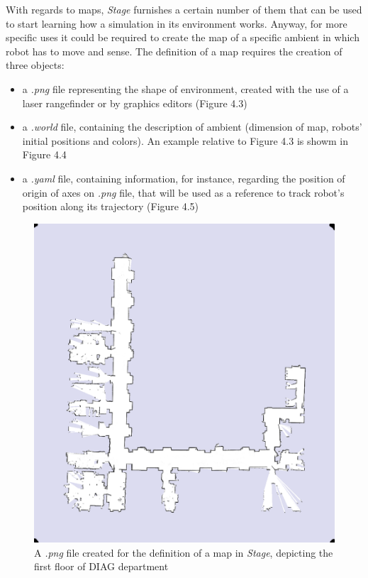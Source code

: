 \documentclass[a4paper, onecolumn]{report}
\begin{document}
With regards to maps, \emph{Stage} furnishes a certain number of them that can be used to start learning how a simulation in its environment works. Anyway, for more specific uses it could be required to create the map of a specific ambient in which robot has to move and sense. The definition of a map requires the creation of three objects:
\begin{itemize}
	\item{a \emph{.png} file representing the shape of environment, created with the use of a laser rangefinder or by graphics editors (Figure 4.3)}
	\item{a \emph{.world} file, containing the description of ambient (dimension of map, robots' initial positions and colors). An example relative to Figure 4.3 is showm in Figure 4.4}
	\item{a \emph{.yaml} file, containing information, for instance, regarding the position of origin of axes on \emph{.png} file, that will be used as a reference to track robot's position along its trajectory (Figure 4.5)}
\end{itemize}
\begin{figure}[htbp]
\centering
\includegraphics[width=1\textwidth]{images/mappa_dis/dis-B1-2011-09-27.png}
\caption{A \emph{.png} file created for the definition of a map in \emph{Stage}, depicting the first floor of DIAG department}
\end{figure}
\end{document}
